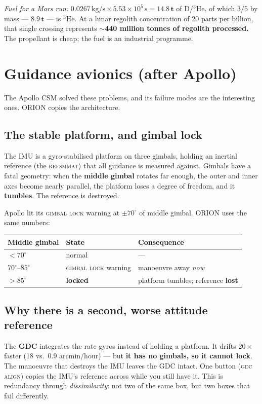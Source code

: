\documentclass[11pt]{article}
\newcommand{\he}{\ensuremath{{}^3\mathrm{He}}}
\newcommand{\unit}[1]{\,\mathrm{#1}}
\begin{document}
\textit{Fuel for a Mars run:} $0.0267\unit{kg/s}\times 5.53\times10^{5}\unit{s}=\mathbf{14.8\,t}$ of D/\he, of which $3/5$ by mass --- $\mathbf{8.9\,t}$ --- is \he. At a lunar regolith concentration of 20 parts per billion, that single crossing represents \textbf{$\sim$440 million tonnes of regolith processed.} The propellant is cheap; the fuel is an industrial programme.

\section{Guidance avionics (after Apollo)}
The Apollo CSM solved these problems, and its failure modes are the interesting ones. ORION copies the architecture.

\subsection{The stable platform, and gimbal lock}
The IMU is a gyro-stabilised platform on three gimbals, holding an inertial reference (the \textsc{refsmmat}) that all guidance is measured against. Gimbals have a fatal geometry: when the \textbf{middle gimbal} rotates far enough, the outer and inner axes become nearly parallel, the platform loses a degree of freedom, and it \textbf{tumbles}. The reference is destroyed.

Apollo lit its \textsc{gimbal lock} warning at $\pm70^\circ$ of middle gimbal. ORION uses the same numbers:
\begin{center}\small
\begin{tabular}{@{}lll@{}}
\toprule
Middle gimbal & State & Consequence\\
\midrule
$<70^\circ$ & normal & ---\\
$70^\circ$--$85^\circ$ & \textsc{gimbal lock} warning & manoeuvre away \emph{now}\\
$>85^\circ$ & \textbf{locked} & platform tumbles; reference \textbf{lost}\\
\bottomrule
\end{tabular}
\end{center}

\subsection{Why there is a second, worse attitude reference}
The \textbf{GDC} integrates the rate gyros instead of holding a platform. It drifts $20\times$ faster (18 vs.\ 0.9 arcmin/hour) --- but \textbf{it has no gimbals, so it cannot lock}. The manoeuvre that destroys the IMU leaves the GDC intact. One button (\textsc{gdc align}) copies the IMU's reference across while you still have it. This is redundancy through \emph{dissimilarity}: not two of the same box, but two boxes that fail differently.
\end{document}
